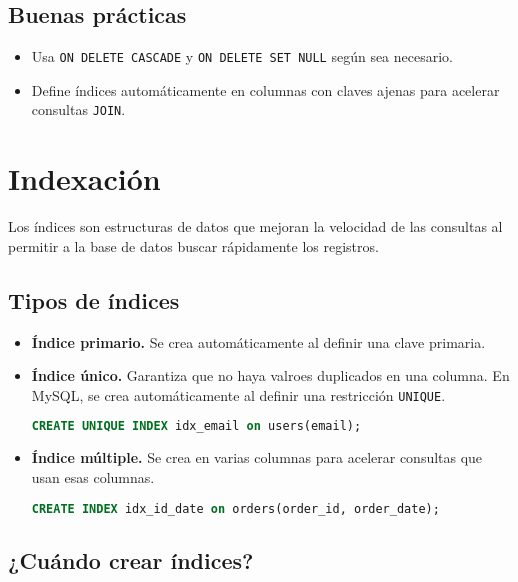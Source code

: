 \subsection{Buenas prácticas}

\begin{itemize}
    \item Usa \texttt{ON DELETE CASCADE} y \texttt{ON DELETE SET NULL} según sea necesario.
    \item Define índices automáticamente en columnas con claves ajenas para acelerar consultas \texttt{JOIN}.
\end{itemize}

\section{Indexación}

Los índices son estructuras de datos que mejoran la velocidad
de las consultas al permitir a la base de datos buscar
rápidamente los registros.

\subsection{Tipos de índices}

\begin{itemize}
    \item \textbf{Índice primario.} Se crea automáticamente al definir una clave primaria.

    \item \textbf{Índice único.} Garantiza que no haya valroes duplicados en una columna.
    En MySQL, se crea automáticamente al definir una restricción \texttt{UNIQUE}.
\begin{lstlisting}[language=SQL]
CREATE UNIQUE INDEX idx_email on users(email);
\end{lstlisting}

    \item \textbf{Índice múltiple.} Se crea en varias columnas para acelerar consultas que usan esas columnas.
\begin{lstlisting}[language=SQL]
CREATE INDEX idx_id_date on orders(order_id, order_date);
\end{lstlisting}
\end{itemize}

\subsection{¿Cuándo crear índices?}

